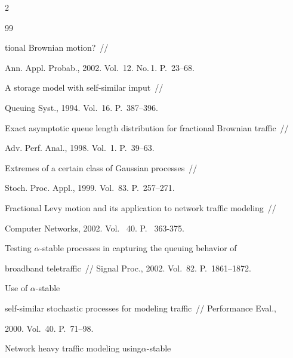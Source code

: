 \begin{multicols}{2}
{{\begin{thebibliography}{99}
\noindent

tional Brownian motion?~//

Ann. Appl. Probab., 2002. Vol.~12. No.\,1. P.~23--68. 




 A storage model with self-similar imput~// 

Queuing Syst., 1994. Vol.~16. P.~387--396. 




 Exact asymptotic queue length distribution for fractional Brownian traffic~//

  Adv. Perf. Anal., 1998. Vol.~1. P.~39--63.




 Extremes of a certain class of Gaussian processes~// 

Stoch. Proc. Appl., 1999. Vol.~83. P.~257--271.





Fractional Levy motion and its application to network traffic modeling~// 

Computer Networks, 2002. Vol.~ 40. P.~ 363-375. 





Testing $\alpha$-stable processes in capturing the queuing behavior of

broadband teletraffic~// Signal Proc., 2002. Vol.~82.  P.~1861--1872.  




  Use of $\alpha$-stable 

self-similar stochastic processes for modeling traffic~//  Performance Eval., 

2000. Vol.~40. P.~71--98.




 Network heavy traffic modeling using\linebreak $\alpha$-stable


\end{thebibliography}}}
\end{multicols}
